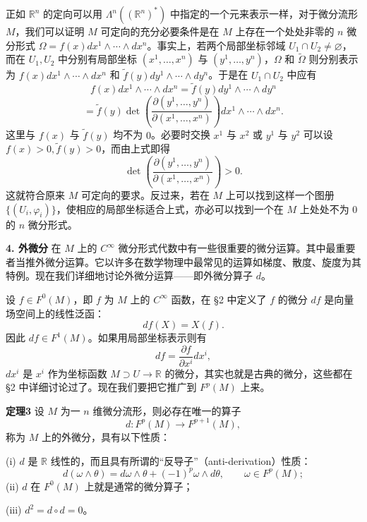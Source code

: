 正如 $\mathbb R^n$ 的定向可以用 $\Lambda^n((\mathbb R^n)^*)$ 中指定的一个元来表示一样，对于微分流形 $M$，我们可以证明 $M$ 可定向的充分必要条件是在 $M$ 上存在一个处处非零的 $n$ 微分形式 $\Omega=f(x)dx^1\wedge\cdots\wedge dx^n$。事实上，若两个局部坐标邻域 $U_1\cap U_2\ne\varnothing$，而在 $U_1,U_2$ 中分别有局部坐标 $(x^1,\ldots,x^n)$ 与 $(y^1,\ldots,y^n)$，$\Omega$ 和 $\widetilde\Omega$ 则分别表示为 $f(x)dx^1\wedge\cdots\wedge dx^n$ 和 $\tilde f(y)dy^1\wedge\cdots\wedge dy^n$。于是在 $U_1\cap U_2$ 中应有
\[
 f(x)dx^1\wedge\cdots\wedge dx^n
 =\tilde f(y)dy^1\wedge\cdots\wedge dy^n
\]
\[
 =\tilde f(y)\det\left(\frac{\partial(y^1,\ldots,y^n)}{\partial(x^1,\ldots,x^n)}\right)dx^1\wedge\cdots\wedge dx^n.
\]
这里与 $f(x)$ 与 $\tilde f(y)$ 均不为 $0$。必要时交换 $x^1$ 与 $x^2$ 或 $y^1$ 与 $y^2$ 可以设 $f(x)>0,\tilde f(y)>0$，而由上式即得
\[
 \det\left(\frac{\partial(y^1,\ldots,y^n)}{\partial(x^1,\ldots,x^n)}\right)>0.
\]
这就符合原来 $M$ 可定向的要求。反过来，若在 $M$ 上可以找到这样一个图册 $\{(U_i,\varphi_i)\}$，使相应的局部坐标适合上式，亦必可以找到一个在 $M$ 上处处不为 $0$ 的 $n$ 微分形式。

\noindent\textbf{4. 外微分}\quad
在 $M$ 上的 $C^\infty$ 微分形式代数中有一些很重要的微分运算。其中最重要者当推外微分运算。它以许多在数学物理中最常见的运算如梯度、散度、旋度为其特例。现在我们详细地讨论外微分运算——即外微分算子 $d$。

设 $f\in F^0(M)$，即 $f$ 为 $M$ 上的 $C^\infty$ 函数，在 §2 中定义了 $f$ 的微分 $df$ 是向量场空间上的线性泛函：
\[
 df(X)=X(f).
\]
因此 $df\in F^1(M)$。如果用局部坐标表示则有
\[
 df=\frac{\partial f}{\partial x^i}dx^i,
\]
$dx^i$ 是 $x^i$ 作为坐标函数 $M\supset U\to\mathbb R$ 的微分，其实也就是古典的微分，这些都在 §2 中详细讨论过了。现在我们要把它推广到 $F^p(M)$ 上来。

\noindent\textbf{定理3}
设 $M$ 为一 $n$ 维微分流形，则必存在唯一的算子
\[
 d:F^p(M)\longrightarrow F^{p+1}(M),
\]
称为 $M$ 上的外微分，具有以下性质：

(i) $d$ 是 $\mathbb R$ 线性的，而且具有所谓的“反导子”（anti-derivation）性质：
\begin{equation}
 d(\omega\wedge\theta)=d\omega\wedge\theta+(-1)^p\omega\wedge d\theta,
 \qquad \omega\in F^p(M);
 \tag{18}
\end{equation}
(ii) $d$ 在 $F^0(M)$ 上就是通常的微分算子；

(iii) $d^2=d\circ d=0$。

